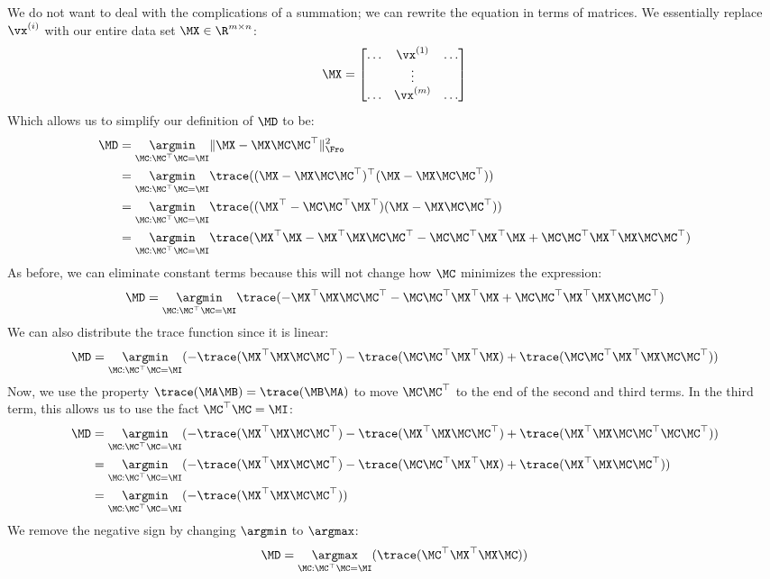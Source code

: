 We do not want to deal with the complications of a summation; we can rewrite the equation in terms of matrices.  We essentially replace $\vx^{(i)}$ with our entire data set $\MX \in \R^{m \times n}$:
$$\MX = \begin{bmatrix} \ldots & \vx^{(1)} & \ldots\\ & \vdots &\\ \ldots & \vx^{(m)} & \ldots \end{bmatrix}$$
Which allows us to simplify our definition of $\MD$ to be: 
\begin{align*}
    \MD &= \underset{\MC : \MC^\top\MC = \MI}{\argmin} \|\MX - \MX\MC\MC^\top\|^2_\Fro\\
&= \underset{\MC : \MC^\top\MC = \MI}{\argmin} \trace((\MX - \MX\MC\MC^\top)^\top(\MX - \MX\MC\MC^\top))\\
&= \underset{\MC : \MC^\top\MC = \MI}{\argmin} \trace((\MX^\top - \MC\MC^\top\MX^\top)(\MX - \MX\MC\MC^\top))\\
&= \underset{\MC : \MC^\top\MC = \MI}{\argmin} \trace(\MX^\top\MX - \MX^\top\MX\MC\MC^\top - \MC\MC^\top\MX^\top\MX + \MC\MC^\top\MX^\top\MX\MC\MC^\top)
\end{align*}
As before, we can eliminate constant terms because this will not change how $\MC$ minimizes the expression:
$$\MD = \underset{\MC : \MC^\top\MC = \MI}{\argmin} \trace(-\MX^\top\MX\MC\MC^\top - \MC\MC^\top\MX^\top\MX + \MC\MC^\top\MX^\top\MX\MC\MC^\top)$$
We can also distribute the trace function since it is linear:
$$\MD = \underset{\MC : \MC^\top\MC = \MI}{\argmin} (-\trace(\MX^\top\MX\MC\MC^\top) - \trace(\MC\MC^\top\MX^\top\MX) + \trace(\MC\MC^\top\MX^\top\MX\MC\MC^\top))$$
Now, we use the property $\trace(\MA\MB) = \trace(\MB\MA)$ to move $\MC\MC^\top$ to the end of the second and third terms.  In the third term, this allows us to use the fact $\MC^\top\MC = \MI$:
\begin{align*}
    \MD &= \underset{\MC : \MC^\top\MC = \MI}{\argmin} (-\trace(\MX^\top\MX\MC\MC^\top) - \trace(\MX^\top\MX\MC\MC^\top) + \trace(\MX^\top\MX\MC\MC^\top\MC\MC^\top))\\
&= \underset{\MC : \MC^\top\MC = \MI}{\argmin} (-\trace(\MX^\top\MX\MC\MC^\top) - \trace(\MC\MC^\top\MX^\top\MX) + \trace(\MX^\top\MX\MC\MC^\top))\\
&= \underset{\MC : \MC^\top\MC = \MI}{\argmin} (-\trace(\MX^\top\MX\MC\MC^\top))
\end{align*}
We remove the negative sign by changing $\argmin$ to $\argmax$:
$$\MD = \underset{\MC : \MC^\top\MC = \MI}{\argmax} (\trace(\MC^\top\MX^\top\MX\MC))$$
